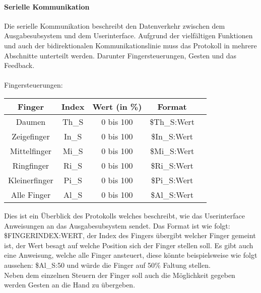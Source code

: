 \documentclass[titlepage,12pt,twoside]{article}
\begin{document}
\paragraph{Serielle Kommunikation}
\label{par:Serielle Kommunikation}
\hfill \break
\hfill \break
Die serielle Kommunikation beschreibt den Datenverkehr zwischen dem Ausgabesubsystem und dem Userinterface. Aufgrund der vielfältigen Funktionen und auch 
der bidirektionalen Kommunikationslinie muss das Protokoll in mehrere Abschnitte unterteilt werden. Darunter Fingersteuerungen, Gesten und das Feedback. \\
\\
Fingersteuerungen: \\
\begin{table}[H]
    \centering
    \begin{tabular}{|c|c|c|c|c|}  %
        \hline
        \textbf{Finger} & \textbf{Index} & \textbf{Wert (in \%)} & \textbf{Format} \\
        \hline
		Daumen & Th\_S & 0 bis 100 & \$Th\_S:Wert \\
		\hline
		Zeigefinger & In\_S & 0 bis 100 & \$In\_S:Wert \\
		\hline
		Mittelfinger & Mi\_S & 0 bis 100 & \$Mi\_S:Wert \\
		\hline
		Ringfinger & Ri\_S & 0 bis 100 & \$Ri\_S:Wert \\
		\hline
		Kleinerfinger & Pi\_S & 0 bis 100 & \$Pi\_S:Wert \\
		\hline
		Alle Finger & Al\_S & 0 bis 100 & \$Al\_S:Wert \\
		\hline
    \end{tabular}
    \label{tab:Fingersteuerung}
\end{table}
\hfill \break
Dies ist ein Überblick des Protokolls welches beschreibt, wie das Userinterface Anweisungen an das Ausgabesubsystem sendet. Das Format ist wie folgt: 
\$FINGERINDEX:WERT, der Index des Fingers übergibt welcher Finger gemeint ist, der Wert besagt auf welche Position sich der Finger stellen soll.
Es gibt auch eine Anweisung, welche alle Finger ansteuert, diese könnte beispielsweise wie folgt aussehen: \$Al\_S:50 und würde die Finger auf 50\% Faltung 
stellen. \\
Neben dem einzelnen Steuern der Finger soll auch die Möglichkeit gegeben werden Gesten an die Hand zu übergeben. \\
\\
\end{document}

